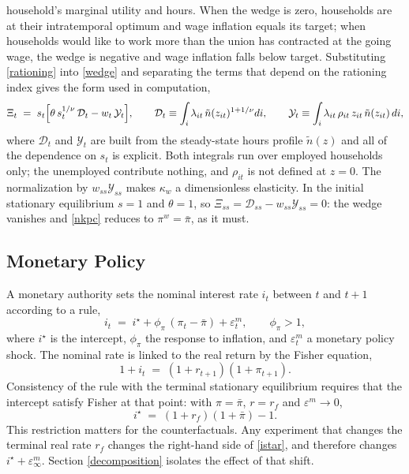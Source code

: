 household's marginal utility and hours. When the wedge is zero, households are
at their intratemporal optimum and wage inflation equals its target; when
households would like to work more than the union has contracted at the going
wage, the wedge is negative and wage inflation falls below target. Substituting
\eqref{rationing} into \eqref{wedge} and separating the terms that depend on the
rationing index gives the form used in computation,
\begin{equation}\label{wedge_DY}
  \Xi_t \;=\; s_t\Bigl[\theta\, s_t^{1/\nu}\,\mathcal{D}_t - w_t\,\mathcal{Y}_t\Bigr],
  \qquad
  \mathcal{D}_t \equiv \int_i \lambda_{it}\,\tilde n(z_{it})^{1+1/\nu} di,
  \qquad
  \mathcal{Y}_t \equiv \int_i \lambda_{it}\,\rho_{it}\, z_{it}\, \tilde n(z_{it})\, di,
\end{equation}
where $\mathcal{D}_t$ and $\mathcal{Y}_t$ are built from the steady-state hours
profile $\tilde n(z)$ and all of the dependence on $s_t$ is explicit. Both
integrals run over employed households only; the unemployed contribute nothing,
and $\rho_{it}$ is not defined at $z=0$. The normalization by
$w_{ss}\mathcal{Y}_{ss}$ makes $\kappa_w$ a dimensionless elasticity. In the
initial stationary equilibrium $s=1$ and $\theta=1$, so
$\Xi_{ss} = \mathcal{D}_{ss} - w_{ss}\mathcal{Y}_{ss} = 0$: the wedge vanishes
and \eqref{nkpc} reduces to $\pi^w = \bar\pi$, as it must.

\subsection{Monetary Policy} \label{monetary}

A monetary authority sets the nominal interest rate $i_t$ between $t$ and $t+1$
according to a \textcite{Taylor-1993} rule,
\begin{equation}\label{taylor}
  i_t \;=\; i^\star + \phi_\pi\,(\pi_t - \bar\pi) + \varepsilon^m_t ,
  \qquad \phi_\pi > 1,
\end{equation}
where $i^\star$ is the intercept, $\phi_\pi$ the response to inflation, and
$\varepsilon^m_t$ a monetary policy shock. The nominal rate is linked to the
real return by the Fisher equation,
\begin{equation}\label{fisher}
  1 + i_t \;=\; (1+r_{t+1})(1+\pi_{t+1}).
\end{equation}
Consistency of the rule with the terminal stationary equilibrium requires that
the intercept satisfy Fisher at that point: with $\pi=\bar\pi$,
$r=r_f$ and $\varepsilon^m\to0$,
\begin{equation}\label{istar}
  i^\star \;=\; (1+r_f)(1+\bar\pi) - 1 .
\end{equation}
This restriction matters for the counterfactuals. Any experiment that changes
the terminal real rate $r_f$ changes the right-hand side of \eqref{istar}, and
therefore changes $i^\star + \varepsilon^m_\infty$. Section
\ref{decomposition} isolates the effect of that shift.


